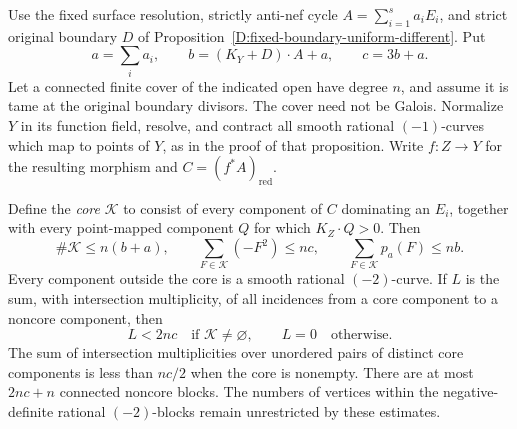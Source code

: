 \begin{proposition}
\label{D:exceptional-degree-linear-core}
Use the fixed surface resolution, strictly anti-nef cycle
$A=\sum_{i=1}^{s}a_iE_i$, and strict original boundary $D$ of
Proposition~\ref{D:fixed-boundary-uniform-different}.  Put
\[
 a=\sum_i a_i,\qquad
 b=(K_Y+D)\cdot A+a,\qquad c=3b+a.
\]
Let a connected finite cover of the indicated open have degree
$n$, and assume it is tame at the original boundary divisors.
The cover need not be Galois.  Normalize $Y$ in its function
field, resolve, and contract all smooth rational $(-1)$-curves
which map to points of $Y$, as in the proof of that proposition.
Write $f:Z\to Y$ for the resulting morphism and
$C=(f^*A)_{\mathrm{red}}$.

Define the \emph{core} $\mathcal K$ to consist of every component
of $C$ dominating an $E_i$, together with every point-mapped
component $Q$ for which $K_Z\cdot Q>0$.  Then
\[
 \#\mathcal K\le n(b+a),\qquad
 \sum_{F\in\mathcal K}(-F^2)\le nc,\qquad
 \sum_{F\in\mathcal K}p_a(F)\le nb.                 \tag{D.GC.1}
\]
Every component outside the core is a smooth rational
$(-2)$-curve.  If $L$ is the sum, with intersection
multiplicity, of all incidences from a core component to a
noncore component, then
\[
                 L<2nc\quad\text{if }\mathcal K\ne\varnothing,
                 \qquad L=0\quad\text{otherwise}.       \tag{D.GC.2}
\]
The sum of intersection multiplicities over unordered pairs of
distinct core components is less than $nc/2$ when the core is nonempty.
There are at most $2nc+n$ connected noncore blocks.
The numbers of vertices within the negative-definite rational
$(-2)$-blocks remain unrestricted by these estimates.
\end{proposition}

